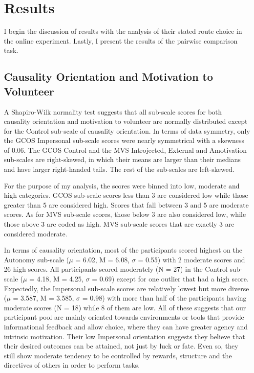 \section{Results}
I begin the discussion of results with the analysis of their stated route choice in the online experiment. Lastly, I present the results of the pairwise comparison task. 

\subsection{Causality Orientation and Motivation to Volunteer}
A Shapiro-Wilk normality test suggests that all sub-scale scores for both causality orientation and motivation to volunteer are normally distributed except for the Control sub-scale of causality orientation. In terms of data symmetry, only the GCOS Impersonal sub-scale scores were nearly symmetrical with a skewness of 0.06. The GCOS Control and the MVS Introjected, External and Amotivation sub-scales are right-skewed, in which their means are larger than their medians and have larger right-handed tails. The rest of the sub-scales are left-skewed. 

For the purpose of my analysis, the scores were binned into low, moderate and high categories. GCOS sub-scale scores less than 3 are considered low while those greater than 5 are considered high. Scores that fall between 3 and 5 are moderate scores. As for MVS sub-scale scores, those below 3 are also considered low, while those above 3 are coded as high. MVS sub-scale scores that are exactly 3 are considered moderate.

In terms of causality orientation, most of the participants scored highest on the Autonomy sub-scale ($\mu$ =  6.02, M = 6.08, $\sigma$ = 0.55) with 2 moderate scores and 26 high scores. All participants scored moderately (N = 27) in the Control sub-scale ($\mu$ =  4.18, M = 4.25, $\sigma$ = 0.69) except for one outlier that had a high score. Expectedly, the Impersonal sub-scale scores are relatively lowest but more diverse ($\mu$ =  3.587, M = 3.585, $\sigma$ = 0.98) with more than half of the participants having moderate scores (N = 18) while 8 of them are low. All of these suggests that our participant pool are mainly oriented towards environments or tools that provide informational feedback and allow choice, where they can have greater agency and intrinsic motivation. Their low Impersonal orientation suggests they believe that their desired outcomes can be attained, not just by luck or fate. Even so, they still show moderate tendency to be controlled by rewards, structure and the directives of others in order to perform tasks.  

